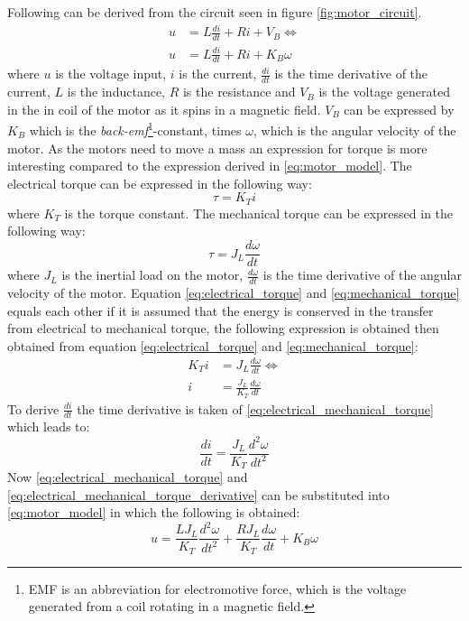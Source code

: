 Following can be derived from the circuit seen in figure \ref{fig:motor_circuit}.
\begin{align}
	u &= L\frac{di}{dt} +  Ri + V_B \Longleftrightarrow\\
	u &= L\frac{di}{dt} +  Ri + K_B\omega\label{eq:motor_model}
\end{align}
where $u$ is the voltage input, $i$ is the current, $\frac{di}{dt}$ is the time derivative of the current, $L$ is the inductance, $R$ is the resistance and $V_B$ is the voltage generated in the in coil of the motor as it spins in a magnetic field. $V_B$ can be expressed by $K_B$ which is the \textit{back-emf}\footnote{EMF is an abbreviation for electromotive force, which is the voltage generated from a coil rotating in a magnetic field.}-constant, times $\omega$, which is the angular velocity of the motor. As the motors need to move a mass an expression for torque is more interesting compared to the expression derived in \ref{eq:motor_model}. The electrical torque can be expressed in the following way:
\begin{equation}
	\tau = K_Ti\label{eq:electrical_torque}
\end{equation}
where $K_T$ is the torque constant.	The mechanical torque can be expressed in the following way:
\begin{equation}
	\tau = J_L\frac{d\omega}{dt}\label{eq:mechanical_torque}
\end{equation}
where $J_L$ is the inertial load on the motor, $\frac{d\omega}{dt}$ is the time derivative of the angular velocity of the motor. Equation \ref{eq:electrical_torque} and \ref{eq:mechanical_torque} equals each other if it is assumed that the energy is conserved in the transfer from electrical to mechanical torque, the following expression is obtained then obtained from equation \ref{eq:electrical_torque} and \ref{eq:mechanical_torque}:
\begin{align}
	K_Ti &= J_L\frac{d\omega}{dt} \Leftrightarrow\\
	i &= \frac{J_L}{K_T} \frac{d\omega}{dt}\label{eq:electrical_mechanical_torque}
\end{align}
To derive $\frac{di}{dt}$ the time derivative is taken of \ref{eq:electrical_mechanical_torque} which leads to:
\begin{equation}
	\frac{di}{dt} = \frac{J_L}{K_T} \frac{d^{2}\omega}{dt^{2}}\label{eq:electrical_mechanical_torque_derivative}
\end{equation}
Now \ref{eq:electrical_mechanical_torque} and \ref{eq:electrical_mechanical_torque_derivative} can be substituted into \ref{eq:motor_model} in which the following is obtained:
\begin{equation}
	u = \frac{L J_L}{K_T} \frac{d^{2}\omega}{dt^{2}} + \frac{R J_L}{K_T} \frac{d\omega}{dt} + K_B \omega\label{eq:model_model}
\end{equation}

